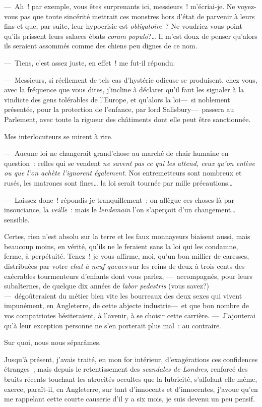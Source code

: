 \documentclass[french,twoside]{book} %
\begin{document}
— Ah ! par exemple, vous êtes surprenants ici, messieurs ! m’écriai-je. Ne voyez-vous pas que toute sincérité mettrait ces monstres hors d’état de parvenir à leurs fins et que, par suite, leur hypocrisie est \emph{obligatoire} ? Ne voudriez-vous point qu’ils prissent leurs salaces ébats \emph{coram populo}?… Il m’est doux de penser qu’alors ils seraient assommés comme des chiens peu dignes de ce nom.\par
— Tiens, c’est assez juste, en effet ! me fut-il répondu.\par
— Messieurs, si réellement de tels cas d’hystérie odieuse se produisent, chez vous, avec la fréquence que vous dites, j’incline à déclarer qu’il faut les signaler à la vindicte des gens tolérables   de l’Europe, et qu’alors la loi— si noblement présentée, pour la protection de l’enfance, par lord Salisbury— passera au Parlement, avec toute la rigueur des châtiments dont elle peut être sanctionnée.\par
Mes interlocuteurs se mirent à rire.\par
— Aucune loi ne changerait grand’chose au marché de chair humaine en question : celles qui se vendent \emph{ne savent pas ce qui les attend, ceux qu’on enlève ou que l’on achète l’ignorent également}. Nos entremetteurs sont nombreux et rusés, les matrones sont fines… la loi serait tournée par mille précautions…\par
— Laissez donc ! répondis-je tranquillement ; on allègue ces choses-là par insouciance, la \emph{veille} : mais le \emph{lendemain} l’on s’aperçoit d’un changement… sensible.\par
Certes, rien n’est absolu sur la terre et les faux monnayeurs biaisent aussi, mais beaucoup moins, en vérité, qu’ils ne le feraient sans la loi qui les condamne, ferme, à perpétuité. Tenez ! je vous affirme, moi, qu’un bon millier de caresses, distribuées par votre \emph{chat à neuf}  \emph{ queues} sur les reins de deux à trois cents des exécrables tourmenteurs d’enfants dont vous parlez, — accompagnés, pour leurs subalternes, de quelque dix années de \emph{labor pedestris} (vous savez?) — dégoûteraient du métier bien vite les bourreaux des deux sexes qui vivent impunément, en Angleterre, de cette abjecte industrie— et que bon nombre de vos compatriotes hésiteraient, à l’avenir, à se choisir cette carrière. — J’ajouterai qu’à leur exception personne ne s’en porterait plus mal : au contraire.\par
Sur quoi, nous nous séparâmes.\par
Jusqu’à présent, j’avais traité, en mon for intérieur, d’exagérations ces confidences étranges ; mais depuis le retentissement des \emph{scandales de Londres}, renforcé des bruits récents touchant les atrocités occultes que la lubricité, s’affolant elle-même, exerce, paraît-il, en Angleterre, sur tant d’innocents et d’innocentes, j’avoue qu’en me rappelant cette courte causerie d’il y a six mois, je suis devenu un peu pensif.
\end{document}
